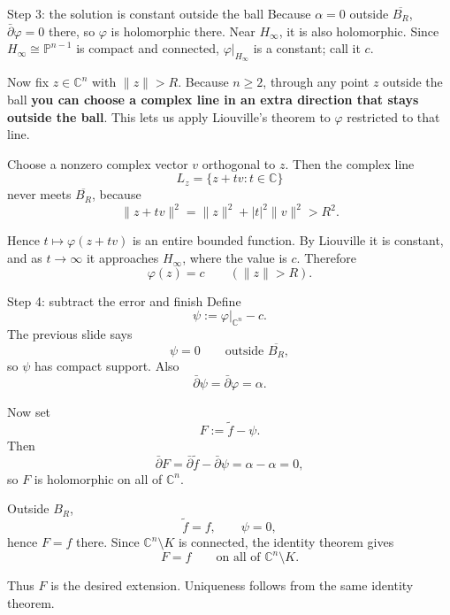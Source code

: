 \documentclass[aspectratio=169,11pt]{beamer}
\newcommand{\db}{\bar\partial}
\newcommand{\C}{\mathbb C}
\begin{document}
\begin{frame}{Step 3: the solution is constant outside the ball}
Because $\alpha=0$ outside $\overline{B_R}$,
\(
\db\varphi=0
\) there,
so $\varphi$ is holomorphic there.
Near $H_\infty$, it is also holomorphic. Since
$H_\infty\cong\mathbb P^{n-1}$ is compact and connected,
$\varphi|_{H_\infty}$ is a constant; call it $c$.

Now fix $z\in\C^n$ with $\|z\|>R$.
Because $n\ge2$, through any point $z$
outside the ball {\bf you can choose
a complex line in an extra direction that
stays outside the ball}.
This lets us apply Liouville's theorem to $\varphi$ restricted to that line.

Choose a nonzero complex vector $v$ orthogonal to $z$. Then the complex line
\[
L_z=\{z+tv:t\in\C\}
\]
never meets $\overline{B_R}$, because
\[
\|z+tv\|^2=\|z\|^2+|t|^2\|v\|^2>R^2.
\]

Hence $t\mapsto\varphi(z+tv)$ is an entire bounded function.
By Liouville it is constant, and as $t\to\infty$ it approaches
$H_\infty$, where the value is $c$. Therefore
\[
\boxed{\varphi(z)=c\qquad(\|z\|>R).}
\]
\end{frame}

\begin{frame}{Step 4: subtract the error and finish}
Define
\[
\psi:=\varphi|_{\C^n}-c.
\]
The previous slide says
\[
\psi=0
\qquad\text{outside }\overline{B_R},
\]
so $\psi$ has compact support. Also
\[
\db\psi=\db\varphi=\alpha.
\]

Now set
\[
\boxed{F:=\widetilde f-\psi.}
\]
Then
\[
\db F
=\db\widetilde f-\db\psi
=\alpha-\alpha
=0,
\]
so $F$ is holomorphic on all of $\C^n$.

Outside $B_R$,
\[
\widetilde f=f,
\qquad
\psi=0,
\]
hence $F=f$ there. Since $\C^n\setminus K$ is connected, the identity
theorem gives
\[
F=f\qquad\text{on all of }\C^n\setminus K.
\]

Thus $F$ is the desired extension. Uniqueness follows from the same identity
theorem.
\end{frame}
\end{document}
